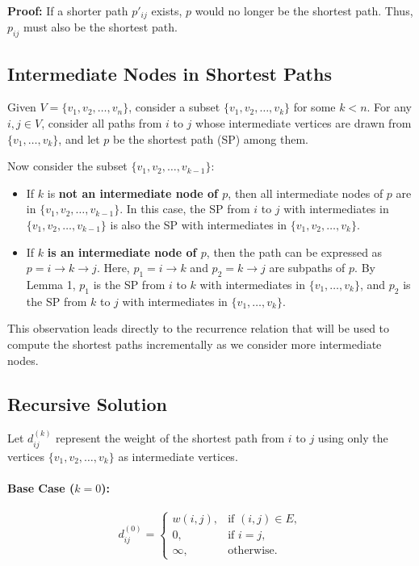 \textbf{Proof:}  
If a shorter path \( p'_{ij} \) exists, \( p \) would no longer be the shortest path. Thus, \( p_{ij} \) must also be the shortest path.

\subsection{Intermediate Nodes in Shortest Paths}

Given \( V = \{v_1, v_2, \dots, v_n\} \), consider a subset \( \{v_1, v_2, \dots, v_k\} \) for some \( k < n \). For any \( i, j \in V \), consider all paths from \( i \) to \( j \) whose intermediate vertices are drawn from \( \{v_1, \dots, v_k\} \), and let \( p \) be the shortest path (SP) among them.

Now consider the subset \( \{v_1, v_2, \dots, v_{k-1}\} \):
\begin{itemize}
    \item If \( k \) is \textbf{not an intermediate node of \( p \)}, then all intermediate nodes of \( p \) are in \( \{v_1, v_2, \dots, v_{k-1}\} \). In this case, the SP from \( i \) to \( j \) with intermediates in \( \{v_1, v_2, \dots, v_{k-1}\} \) is also the SP with intermediates in \( \{v_1, v_2, \dots, v_k\} \).

    \item If \( k \) \textbf{is an intermediate node of \( p \)}, then the path can be expressed as \( p = i \to k \to j \). Here, \( p_1 = i \to k \) and \( p_2 = k \to j \) are subpaths of \( p \). By Lemma 1, \( p_1 \) is the SP from \( i \) to \( k \) with intermediates in \( \{v_1, \dots, v_k\} \), and \( p_2 \) is the SP from \( k \) to \( j \) with intermediates in \( \{v_1, \dots, v_k\} \).
\end{itemize}

This observation leads directly to the recurrence relation that will be used to compute the shortest paths incrementally as we consider more intermediate nodes.

\subsection{Recursive Solution}
Let \( d^{(k)}_{ij} \) represent the weight of the shortest path from \( i \) to \( j \) using only the vertices \( \{v_1, v_2, \dots, v_k\} \) as intermediate vertices.

\paragraph{Base Case (\( k = 0 \)):}
\[
d^{(0)}_{ij} = 
\begin{cases} 
w(i, j), & \text{if } (i, j) \in E, \\
0, & \text{if } i = j, \\
\infty, & \text{otherwise.}
\end{cases}
\]

